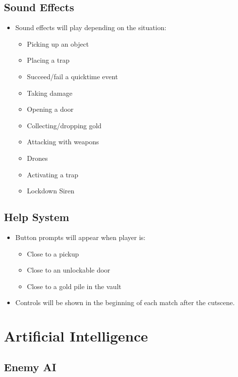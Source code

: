 \documentclass[11pt]{report}
\begin{document}
\section{Sound Effects}

\begin{itemize}
    \item Sound effects will play depending on the situation:
    \begin{itemize}
        \item Picking up an object
        \item Placing a trap
        \item Succeed/fail a quicktime event
        \item Taking damage
        \item Opening a door
        \item Collecting/dropping gold
        \item Attacking with weapons
        \item Drones
        \item Activating a trap
        \item Lockdown Siren
    \end{itemize}
\end{itemize}

\section{Help System}

\begin{itemize}
    \item Button prompts will appear when player is:
    \begin{itemize}
        \item Close to a pickup
        \item Close to an unlockable door
        \item Close to a gold pile in the vault
    \end{itemize}
    \item Controls will be shown in the beginning of each match after the cutscene.
\end{itemize}

\chapter{Artificial Intelligence}
\section{Enemy AI}
\end{document}

